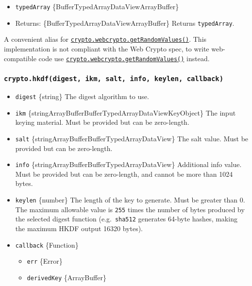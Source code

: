 \begin{itemize}
\tightlist
\item
  \texttt{typedArray}
  \{Buffer\textbar TypedArray\textbar DataView\textbar ArrayBuffer\}
\item
  Returns:
  \{Buffer\textbar TypedArray\textbar DataView\textbar ArrayBuffer\}
  Returns \texttt{typedArray}.
\end{itemize}

A convenient alias for
\href{webcrypto.md\#cryptogetrandomvaluestypedarray}{\texttt{crypto.webcrypto.getRandomValues()}}.
This implementation is not compliant with the Web Crypto spec, to write
web-compatible code use
\href{webcrypto.md\#cryptogetrandomvaluestypedarray}{\texttt{crypto.webcrypto.getRandomValues()}}
instead.

\subsubsection{\texorpdfstring{\texttt{crypto.hkdf(digest,\ ikm,\ salt,\ info,\ keylen,\ callback)}}{crypto.hkdf(digest, ikm, salt, info, keylen, callback)}}\label{crypto.hkdfdigest-ikm-salt-info-keylen-callback}

\begin{itemize}
\tightlist
\item
  \texttt{digest} \{string\} The digest algorithm to use.
\item
  \texttt{ikm}
  \{string\textbar ArrayBuffer\textbar Buffer\textbar TypedArray\textbar DataView\textbar KeyObject\}
  The input keying material. Must be provided but can be zero-length.
\item
  \texttt{salt}
  \{string\textbar ArrayBuffer\textbar Buffer\textbar TypedArray\textbar DataView\}
  The salt value. Must be provided but can be zero-length.
\item
  \texttt{info}
  \{string\textbar ArrayBuffer\textbar Buffer\textbar TypedArray\textbar DataView\}
  Additional info value. Must be provided but can be zero-length, and
  cannot be more than 1024 bytes.
\item
  \texttt{keylen} \{number\} The length of the key to generate. Must be
  greater than 0. The maximum allowable value is \texttt{255} times the
  number of bytes produced by the selected digest function
  (e.g.~\texttt{sha512} generates 64-byte hashes, making the maximum
  HKDF output 16320 bytes).
\item
  \texttt{callback} \{Function\}

  \begin{itemize}
  \tightlist
  \item
    \texttt{err} \{Error\}
  \item
    \texttt{derivedKey} \{ArrayBuffer\}
  \end{itemize}
\end{itemize}

